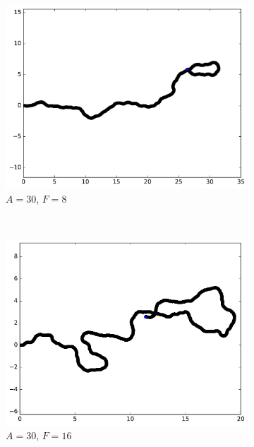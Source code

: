 \begin{figure}[htb]
\begin{subfigure}[t]{\subImgWmo}
			\includegraphics[width=\textwidth]{figures/ch3/synTraj_219_30_8}
			\caption[$A = 30$, $F=8$]{$A = 30$, $F=8$}
			\label{fig:synTraj_219_30_8}
		\end{subfigure}
		~
		\begin{subfigure}[t]{\subImgWmo}
			\centering
			\includegraphics[width=\textwidth]{figures/ch3/synTraj_219_30_16}
			\caption[$A = 30$, $F=16$]{$A = 30$, $F=16$}
			\label{fig:synTraj_219_30_16}
		\end{subfigure}
		~
		\begin{subfigure}[t]{\subImgWmo}
			\centering

\end{subfigure}
\end{figure}
